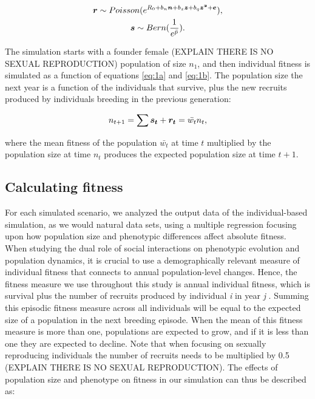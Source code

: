 \documentclass{article}
\begin{document}
\begin{subequations} 
\begin{gather}
\vectorsym{r}\sim Poisson(e^{R_{0} + b_{n} \vectorsym{n} + b_{z} \vectorsym{z} + b_{q} \vectorsym{z^2} + \vectorsym{e}}), \label{eq:1a} \\
\vectorsym{s}\sim Bern(\frac{1}{e^{\bar{p}}}). \label{eq:1b}
\end{gather}
\end{subequations}

The simulation starts with a founder female (EXPLAIN THERE IS NO SEXUAL REPRODUCTION) population of size $n_{1}$, and then individual fitness is simulated as a function of equations \ref{eq:1a} and \ref{eq:1b}. The population size the next year is a function of the individuals that survive, plus the new recruits produced by individuals breeding in the previous generation:

\begin{equation}
n_{t+1}=\sum \vectorsym{s_{t}} + \vectorsym{r_{t}}=\bar{w_{t}}n_{t}, 
\end{equation}

\noindent where the mean fitness of the population $\bar{w_{t}}$ at time $t$  multiplied by the population size at time $n_{t}$ produces the expected population size at time $t + 1$. 

\subsection{Calculating fitness}

For each simulated scenario, we analyzed the output data of the individual-based simulation, as we would natural data sets, using a multiple regression focusing upon how population size and phenotypic differences affect absolute fitness. When studying the dual role of social interactions on phenotypic evolution and population dynamics, it is crucial to use a demographically relevant measure of individual fitness that connects to annual population-level changes. Hence, the fitness measure we use throughout this study is annual individual fitness, which is survival plus the number of recruits produced by individual \textit{i} in year \textit{j}  \citep{Saether2015}. Summing this episodic fitness measure across all individuals will be equal to the expected size of a population in the next breeding episode. When the mean of this fitness measure is more than one, populations are expected to grow, and if it is less than one they are expected to decline. Note that when focusing on sexually reproducing individuals the number of recruits needs to be multiplied by 0.5 (EXPLAIN THERE IS NO SEXUAL REPRODUCTION). The effects of population size and phenotype on fitness in our simulation can thus be described as:
\end{document}
